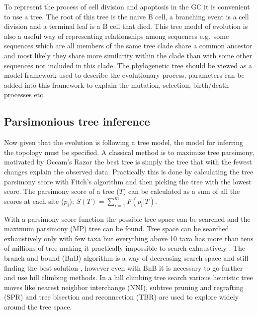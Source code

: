 To represent the process of cell division and apoptosis in the GC it is convenient to use a tree.
The root of this tree is the naive B cell, a branching event is a cell division and a terminal leaf is a B cell that died.
This tree model of evolution is also a useful way of representing relationships among sequences e.g.\ some sequences which are all members of the same tree clade share a common ancestor and most likely they share more similarity within the clade than with some other sequences not included in this clade.
The phylogenetic tree should be viewed as a model framework used to describe the evolutionary process, parameters can be added into this framework to explain the mutation, selection, birth/death processes etc.


\subsection{Parsimonious tree inference}
Now given that the evolution is following a tree model, the model for inferring the topology must be specified.
A classical method is to maximize tree parsimony, motivated by Occam's Razor the best tree is simply the tree that with the fewest changes explain the observed data.
Practically this is done by calculating the tree parsimony score with Fitch's algorithm \cite{fitch1971toward} and then picking the tree with the lowest score.
The parsimony score of a tree ($T$) can be calculated as a sum of all the scores at each site ($p_i$): $S(T) = \sum_{i=1}^m F(p_i | T)$.

With a parsimony score function the possible tree space can be searched and the maximum parsimony (MP) tree can be found.
Tree space can be searched exhaustively only with few taxa but everything above 10 taxa has more than tens of millions of tree making it practically impossible to search exhaustively \cite{felsenstein1978number}.
The branch and bound (BnB) algorithm is a way of decreasing search space and still finding the best solution \cite{hendy1982branch}, however even with BnB  it is necessary to go further and use hill climbing methods.
In a hill climbing tree search various heuristic tree moves like nearest neighbor interchange (NNI), subtree pruning and regrafting (SPR) and tree bisection and reconnection (TBR) are used to explore widely around the tree space.

